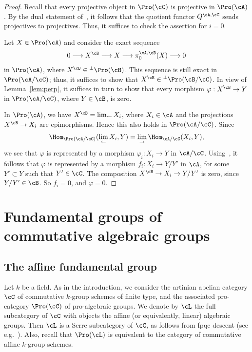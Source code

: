 \begin{proof}
Recall that every projective object in $\Pro(\cC)$ is projective in $\Pro(\cA)$. By the dual statement of~\cite[III.3.Cor.~3]{Gabriel}, it follows that the quotient functor $Q^{\cA,\cC}$ sends projectives to projectives. Thus, it suffices to check the assertion for $i = 0$.

Let $X \in \Pro(\cA)$ and consider the exact sequence
\[
0 \longrightarrow X^{\cB} \longrightarrow X
\longrightarrow \pi_0^{\cA,\cB}(X) \longrightarrow 0
\]
in $\Pro(\cA)$, where $X^{\cB} \in {^{\perp}\Pro(\cB)}$. This sequence is still exact in $\Pro(\cA/\cC)$; thus, it suffices to show that $X^{\cB} \in {^{\perp}\Pro(\cB/\cC)}$. In view of Lemma~\ref{lem:perp}, it suffices in turn to show that every morphism $\varphi : X^{\cB} \to Y$ in $\Pro(\cA/\cC)$, where $Y \in \cB$, is zero.

In $\Pro(\cA)$, we have $X^{\cB} = \lim_{\leftarrow} X_i$, where $X_i \in \cA$ and the projections~$X^{\cB} \to X_i$ are epimorphisms. Hence this also holds in $\Pro(\cA/\cC)$. Since
\[
\Hom_{\Pro(\cA/\cC)}(\lim_{\leftarrow} X_i, Y) = \lim_{\to} \Hom_{\cA/\cC}(X_i, Y),
\]
we see that $\varphi$ is represented by a morphism $\varphi_i : X_i \to Y$ in $\cA/\cC$. Using~\cite[Lem.~2.7]{Br17b}, it follows that $\varphi$ is represented by a morphism $f_i : X_i \to Y/Y'$ in $\cA$, for some $Y' \subset Y$ such that $Y' \in \cC$. The composition $X^{\cB} \to X_i \to Y/Y'$ is zero, since $Y/Y' \in \cB$. So $f_i = 0$, and $\varphi = 0$.
\end{proof}


\section{Fundamental groups of commutative algebraic groups}\label{sec:fundamental}

\subsection{The affine fundamental group}\label{subsec:affine}

Let $k$ be a field. As in the introduction, we consider the artinian abelian category $\cC$ of commutative $k$-group schemes of finite type, and the associated pro-category $\Pro(\cC)$ of pro-algebraic groups. We denote by $\cL$ the full subcategory of $\cC$ with objects the affine (or equivalently, linear) algebraic groups. Then $\cL$ is a Serre subcategory of $\cC$, as follows from fpqc descent (see e.g.~\cite[34.20.18]{SP}). Also, recall that $\Pro(\cL)$ is equivalent to the category of commutative affine $k$-group schemes.


